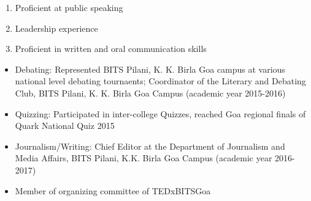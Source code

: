 \documentclass{article}
\begin{document}
\begin{flushleft}
	\vspace{0.30in}
	
	\vspace{0.10in}
	\begin{enumerate}
		\item Proficient at public speaking
		\item Leadership experience
		\item Proficient in written and oral communication skills

	\end{enumerate}
	
\end{flushleft}

	\begin{flushleft}
		\vspace{0.30in}
		
		\vspace{0.10in}
		\begin{itemize}
			
			\item Debating: Represented BITS Pilani, K. K. Birla Goa campus at various national level debating tournaents; Coordinator of the Literary and Debating Club, BITS Pilani, K. K. Birla Goa Campus (academic year 2015-2016)
			\item Quizzing: Participated in inter-college Quizzes, reached Goa regional finals of Quark National Quiz 2015
			\item Journalism/Writing: Chief Editor at the Department of Journalism and Media Affairs, BITS Pilani, K.K. Birla Goa Campus (academic year 2016-2017)
			\item Member of organizing committee of TEDxBITSGoa
			
		\end{itemize}
		
	\end{flushleft}


               	
\end{document}

